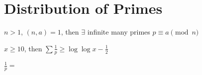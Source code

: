 \section{Distribution of Primes}\label{sec:distribution-of-primes}

\begin{thm}
    $n > 1$, $(n, a) = 1$, then $\exists$ infinite many primes $p \equiv a \pmod{n}$
\end{thm}

\begin{prop}
    $x \geq 10$, then $\sum \frac{1}{p} \geq \log \log x - \frac{1}{2}$
\end{prop}

\begin{fact}
    $\frac{1}{p} = $
\end{fact}